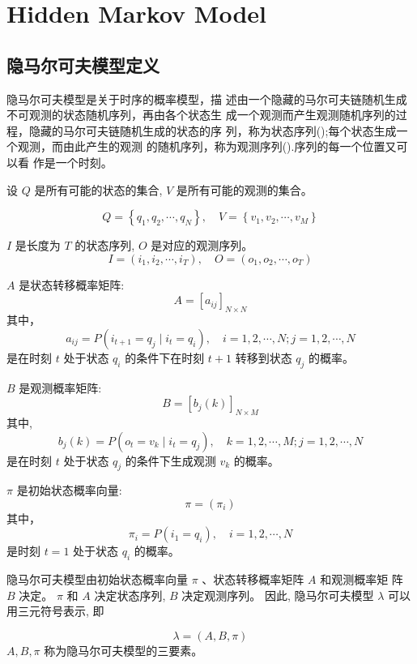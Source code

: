 \chapter{Hidden Markov Model}

\section{隐马尔可夫模型定义}

隐马尔可夫模型是关于时序的概率模型，描
述由一个隐藏的马尔可夫链随机生成不可观测的状态随机序列，再由各个状态生
成一个观测而产生观测随机序列的过程，隐藏的马尔可夫链随机生成的状态的序
列，称为状态序列();每个状态生成一个观测，而由此产生的观测
的随机序列，称为观测序列().序列的每一个位置又可以看
作是一个时刻。 

\begin{definition}[隐马尔可夫模型]
    设 $ Q $ 是所有可能的状态的集合, $ V $ 是所有可能的观测的集合。

$$
Q=\left\{q_{1}, q_{2}, \cdots, q_{N}\right\}, \quad V=\left\{v_{1}, v_{2}, \cdots, v_{M}\right\}
$$

$ I $ 是长度为 $ T $ 的状态序列, $ O $ 是对应的观测序列。
$$
I=\left(i_{1}, i_{2}, \cdots, i_{T}\right), \quad O=\left(o_{1}, o_{2}, \cdots, o_{T}\right)
$$

$ A $ 是状态转移概率矩阵:
$$
A=\left[a_{i j}\right]_{N \times N}
$$
其中，
$$
a_{i j}=P\left(i_{t+1}=q_{j} \mid i_{t}=q_{i}\right), \quad i=1,2, \cdots, N ; j=1,2, \cdots, N
$$
是在时刻 $ t $ 处于状态 $ q_{i} $ 的条件下在时刻 $ t+1 $ 转移到状态 $ q_{j} $ 的概率。

$ B $ 是观测概率矩阵:
$$
B=\left[b_{j}(k)\right]_{N \times M}
$$
其中,
$$
b_{j}(k)=P\left(o_{t}=v_{k} \mid i_{t}=q_{j}\right), \quad k=1,2, \cdots, M ; j=1,2, \cdots, N
$$
是在时刻 $ t $ 处于状态 $ q_{j} $ 的条件下生成观测 $ v_{k} $ 的概率。

$ \pi $ 是初始状态概率向量:
$$
\pi=\left(\pi_{i}\right)
$$
其中，
$$
\pi_{i}=P\left(i_{1}=q_{i}\right), \quad i=1,2, \cdots, N
$$
是时刻 $ t=1 $ 处于状态 $ q_{i} $ 的概率。

\end{definition}

隐马尔可夫模型由初始状态概率向量 $ \pi $ 、状态转移概率矩阵 $ A $ 和观测概率矩 阵 $ B $ 决定。 $ \pi $ 和 $ A $ 决定状态序列, $ B $ 决定观测序列。 因此, 隐马尔可夫模型 $ \lambda $ 可以用三元符号表示, 即

$$
\lambda=(A, B, \pi)
$$
$ A, B, \pi $ 称为隐马尔可夫模型的三要素。

